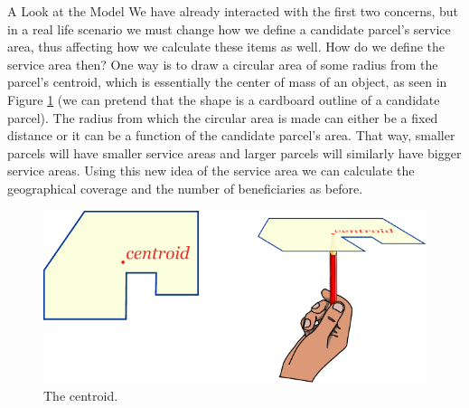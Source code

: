 \documentclass[12pt]{pom_thesis}
\theoremstyle{definition}
\begin{document}
\begin{chapter}{A Look at the Model}
We have already interacted with the first two concerns, but in a real life scenario we must change how we define a candidate parcel's service area, thus affecting how we calculate these items as well. How do we define the service area then? One way is to draw a circular area of some radius from the parcel's centroid, which is essentially the center of mass of an object, as seen in Figure \ref{centroid} (we can pretend that the shape is a cardboard outline of a candidate parcel). The radius from which the circular area is made can either be a fixed distance or it can be a function of the candidate parcel's area. That way, smaller parcels will have smaller service areas and larger parcels will similarly have bigger service areas. Using this new idea of the service area we can calculate the geographical coverage and the number of beneficiaries as before. 

\begin{figure}
\centering
\includegraphics{centroid}
\caption[The centroid.]{The centroid. \footnotemark}
\label{centroid}
\end{figure}


\end{chapter}
\end{document}
